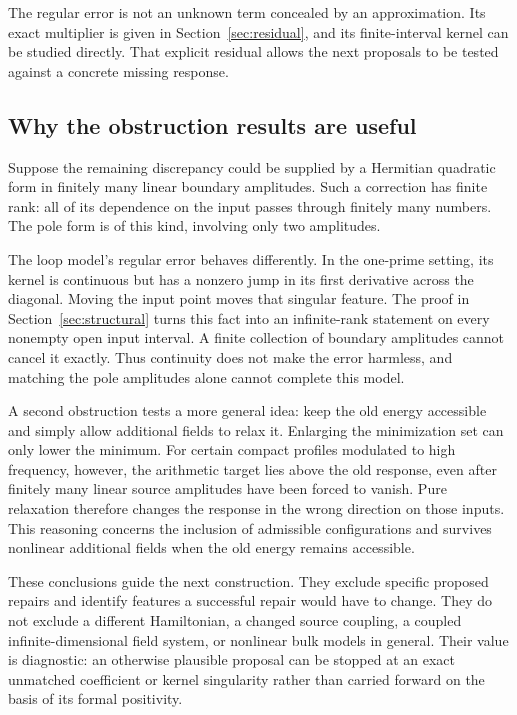 \documentclass[11pt]{article}
\numberwithin{equation}{section}
\theoremstyle{definition}
\theoremstyle{remark}
\begin{document}
The regular error is not an unknown term concealed by an approximation. Its exact multiplier is given in Section~\ref{sec:residual}, and its finite-interval kernel can be studied directly. That explicit residual allows the next proposals to be tested against a concrete missing response.

\subsection*{Why the obstruction results are useful}
Suppose the remaining discrepancy could be supplied by a Hermitian quadratic form in finitely many linear boundary amplitudes. Such a correction has finite rank: all of its dependence on the input passes through finitely many numbers. The pole form is of this kind, involving only two amplitudes.

The loop model's regular error behaves differently. In the one-prime setting, its kernel is continuous but has a nonzero jump in its first derivative across the diagonal. Moving the input point moves that singular feature. The proof in Section~\ref{sec:structural} turns this fact into an infinite-rank statement on every nonempty open input interval. A finite collection of boundary amplitudes cannot cancel it exactly. Thus continuity does not make the error harmless, and matching the pole amplitudes alone cannot complete this model.

A second obstruction tests a more general idea: keep the old energy accessible and simply allow additional fields to relax it. Enlarging the minimization set can only lower the minimum. For certain compact profiles modulated to high frequency, however, the arithmetic target lies above the old response, even after finitely many linear source amplitudes have been forced to vanish. Pure relaxation therefore changes the response in the wrong direction on those inputs. This reasoning concerns the inclusion of admissible configurations and survives nonlinear additional fields when the old energy remains accessible.

These conclusions guide the next construction. They exclude specific proposed repairs and identify features a successful repair would have to change. They do not exclude a different Hamiltonian, a changed source coupling, a coupled infinite-dimensional field system, or nonlinear bulk models in general. Their value is diagnostic: an otherwise plausible proposal can be stopped at an exact unmatched coefficient or kernel singularity rather than carried forward on the basis of its formal positivity.
\end{document}
